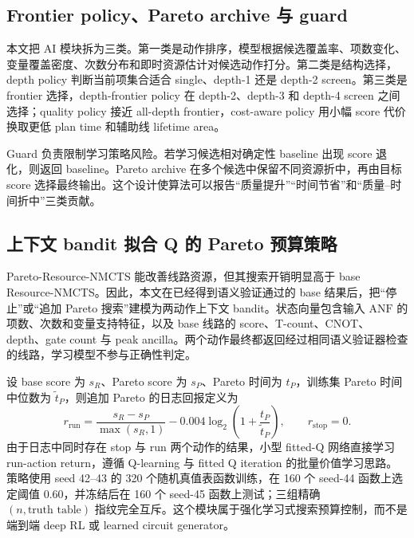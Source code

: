 \documentclass[UTF8,fontset=fandol,11pt]{ctexart}
\newcommand{\method}{Resource-NMCTS}
\newcommand{\anf}{\ensuremath{\mathrm{ANF}}}
\begin{document}
\subsection{Frontier policy、Pareto archive 与 guard}

本文把 AI 模块拆为三类。第一类是动作排序，模型根据候选覆盖率、项数变化、变量覆盖密度、次数分布和即时资源估计对候选动作打分。第二类是结构选择，depth policy 判断当前项集合适合 single、depth-1 还是 depth-2 screen。第三类是 frontier 选择，depth-frontier policy 在 depth-2、depth-3 和 depth-4 screen 之间选择；quality policy 接近 all-depth frontier，cost-aware policy 用小幅 score 代价换取更低 plan time 和辅助线 lifetime area。

Guard 负责限制学习策略风险。若学习候选相对确定性 baseline 出现 score 退化，则返回 baseline。Pareto archive 在多个候选中保留不同资源折中，再由目标 score 选择最终输出。这个设计使算法可以报告“质量提升”“时间节省”和“质量--时间折中”三类贡献。

\subsection{上下文 bandit 拟合 Q 的 Pareto 预算策略}

Pareto-\method{} 能改善线路资源，但其搜索开销明显高于 base \method{}。因此，本文在已经得到语义验证通过的 base 结果后，把“停止”或“追加 Pareto 搜索”建模为两动作上下文 bandit\cite{li2010contextual}。状态向量包含输入 \anf{} 的项数、次数和变量支持特征，以及 base 线路的 score、T-count、CNOT、depth、gate count 与 peak ancilla。两个动作最终都返回经过相同语义验证器检查的线路，学习模型不参与正确性判定。

设 base score 为 $s_R$、Pareto score 为 $s_P$、Pareto 时间为 $t_P$，训练集 Pareto 时间中位数为 $\widetilde t_P$，则追加 Pareto 的日志回报定义为
\begin{equation}
r_{\mathrm{run}}=
\frac{s_R-s_P}{\max(s_R,1)}
-0.004\log_2\!\left(1+\frac{t_P}{\widetilde t_P}\right),
\qquad
r_{\mathrm{stop}}=0 .
\label{eq:budget-policy-reward}
\end{equation}
由于日志中同时存在 stop 与 run 两个动作的结果，小型 fitted-Q 网络直接学习 run-action return，遵循 Q-learning 与 fitted Q iteration 的批量价值学习思路\cite{watkins1992qlearning,ernst2005fittedq}。策略使用 seed 42--43 的 320 个随机真值表函数训练，在 160 个 seed-44 函数上选定阈值 0.60，并冻结后在 160 个 seed-45 函数上测试；三组精确 $(n,\text{truth table})$ 指纹完全互斥。这个模块属于强化学习式搜索预算控制，而不是端到端 deep RL 或 learned circuit generator。
\end{document}
